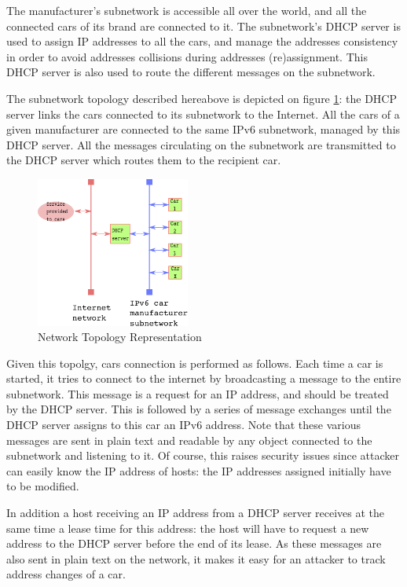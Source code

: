 The manufacturer's subnetwork is accessible all over the world, and
all the connected cars of its brand are connected to it. The
subnetwork's DHCP server is used to assign IP addresses to all the
cars, and manage the addresses consistency in order to avoid addresses
collisions during addresses (re)assignment. This DHCP server is also
used to route the different messages on the subnetwork.

The subnetwork topology described hereabove is depicted on figure
\ref{netw}: the DHCP server links the cars connected to its subnetwork
to the Internet. All the cars of a given manufacturer are connected to
the same IPv6 subnetwork, managed by this DHCP server. All the
messages circulating on the subnetwork are transmitted to the DHCP
server which routes them to the recipient car.

\begin{figure}[h]
    \centering
	\includegraphics[width=0.45\textwidth]{schema/net_topo.pdf}
    \caption{Network Topology Representation }
    \label{netw}
\end{figure}


Given this topolgy, cars connection is performed as follows. Each time
a car is started, it tries to connect to the internet by broadcasting
a message to the entire subnetwork. This message is a request for an
IP address, and should be treated by the DHCP server. This is followed
by a series of message exchanges until the DHCP server assigns to this
car an IPv6 address. Note that these various messages are sent in
plain text and readable by any object connected to the subnetwork and
listening to it. Of course, this raises security issues since attacker
can easily know the IP address of hosts: the IP addresses assigned
initially have to be modified.

In addition a host receiving an IP address from a DHCP server receives
at the same time a lease time for this address: the host will have to
request a new address to the DHCP server before the end of its
lease. As these messages are also sent in plain text on the network,
it makes it easy for an attacker to track address changes of a car.


